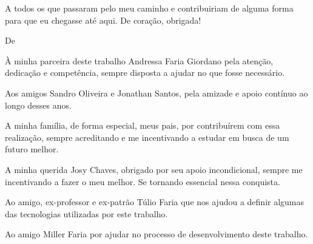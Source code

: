 \begin{agradecimentos}
\par A todos os que passaram pelo meu caminho e contribuiriam de alguma forma para que eu chegasse até aqui. De coração, obrigada!


\vspace*{\fill}
De \imprimirAutorDois
\newline
\par À minha parceira deste trabalho Andressa Faria Giordano pela atenção, dedicação e competência, sempre disposta a ajudar no que fosse necessário.

\par Aos amigos Sandro Oliveira e Jonathan Santos, pela amizade e apoio contínuo ao longo desses anos.

\par A minha família, de forma especial, meus pais, por contribuírem com essa realização, sempre acreditando e me incentivando a estudar em busca de um futuro melhor.

\par A minha querida Josy Chaves, obrigado por seu apoio incondicional, sempre me incentivando a fazer o meu melhor. Se tornando essencial nessa conquista.

\par Ao amigo, ex-professor e ex-patrão Túlio Faria que nos ajudou a definir algumas das tecnologias utilizadas por este trabalho.

\par Ao amigo Miller Faria por ajudar no processo de desenvolvimento deste trabalho.

\end{agradecimentos}




